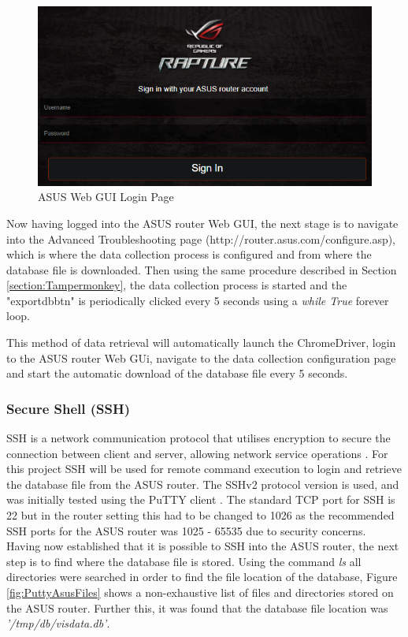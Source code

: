 \begin{figure}[ht]
    \centering
    \includegraphics[width=1\linewidth]{pages/Chapter4/Chapter 4 Images/ASUSLoginPage.PNG}
    \caption{ASUS Web GUI Login Page}
    \label{fig:ASUSLoginPage}
\end{figure}

Now having logged into the ASUS router Web GUI, the next stage is to navigate into the Advanced Troubleshooting page (http://router.asus.com/configure.asp), which is where the data collection process is configured and from where the database file is downloaded. Then using the same procedure described in Section \ref{section:Tampermonkey}, the data collection process is started and the "exportdbbtn" is periodically clicked every 5 seconds using a \textit{while True} forever loop.

This method of data retrieval will automatically launch the ChromeDriver, login to the ASUS router Web GUi, navigate to the data collection configuration page and start the automatic download of the database file every 5 seconds. 


\subsubsection{Secure Shell (SSH)}

SSH is a network communication protocol that utilises encryption to secure the connection between client and server, allowing network service operations \cite{ssh}. For this project SSH will be used for remote command execution to login and retrieve the database file from the ASUS router. The SSHv2 protocol version is used, and was initially tested using the PuTTY client \cite{putty}. The standard TCP port for SSH is 22 but in the router setting this had to be changed to 1026 as the recommended SSH ports for the ASUS router was 1025 - 65535 due to security concerns. Having now established that it is possible to SSH into the ASUS router, the next step is to find where the database file is stored. Using the command \textit{ls} all directories were searched in order to find the file location of the database, Figure \ref{fig:PuttyAsusFiles} shows a non-exhaustive list of files and directories stored on the ASUS router. Further this, it was found that the database file location was \textit{'/tmp/db/visdata.db'}.

